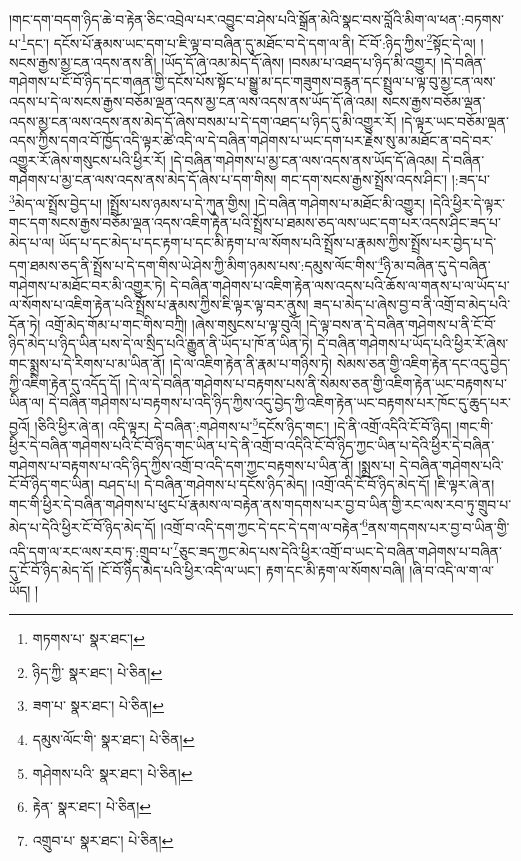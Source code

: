 །གང་དག་བདག་ཉིད་ཆེ་བ་རྟེན་ཅིང་འབྲེལ་པར་འབྱུང་བ་ཤེས་པའི་སྒྲོན་མེའི་སྣང་བས་བློའི་མིག་ལ་ཕན་:བཏགས་པ་\footnote{གཏགས་པ་  སྣར་ཐང་། }དང་། དངོས་པོ་རྣམས་ཡང་དག་པ་ཇི་ལྟ་བ་བཞིན་དུ་མཐོང་བ་དེ་དག་ལ་ནི། ངོ་བོ་:ཉིད་ཀྱིས་\footnote{ཉིད་ཀྱི་  སྣར་ཐང་།  པེ་ཅིན། }སྟོང་དེ་ལ། །སངས་རྒྱས་མྱ་ངན་འདས་ནས་ནི། །ཡོད་དོ་ཞེ་འམ་མེད་དོ་ཞེས། །བསམ་པ་འཐད་པ་ཉིད་མི་འགྱུར། །དེ་བཞིན་གཤེགས་པ་ངོ་བོ་ཉིད་དང་གཞན་གྱི་དངོས་པོས་སྟོང་པ་སྒྱུ་མ་དང་གཟུགས་བརྙན་དང་སྤྲུལ་པ་ལྟ་བུ་མྱ་ངན་ལས་འདས་པ་དེ་ལ་སངས་རྒྱས་བཅོམ་ལྡན་འདས་མྱ་ངན་ལས་འདས་ནས་ཡོད་དོ་ཞེ་འམ། སངས་རྒྱས་བཅོམ་ལྡན་འདས་མྱ་ངན་ལས་འདས་ནས་མེད་དོ་ཞེས་བསམ་པ་དེ་དག་འཐད་པ་ཉིད་དུ་མི་འགྱུར་རོ། །དེ་ལྟར་ཡང་བཅོམ་ལྡན་འདས་ཀྱིས་དགའ་བོ་ཁྱོད་འདི་ལྟར་ཚེ་འདི་ལ་དེ་བཞིན་གཤེགས་པ་ཡང་དག་པར་རྗེས་སུ་མ་མཐོང་ན་བདེ་བར་འགྱུར་རོ་ཞེས་གསུངས་པའི་ཕྱིར་རོ། །དེ་བཞིན་གཤེགས་པ་མྱ་ངན་ལས་འདས་ནས་ཡོད་དོ་ཞེའམ། དེ་བཞིན་གཤེགས་པ་མྱ་ངན་ལས་འདས་ནས་མེད་དོ་ཞེས་པ་དག་གིས། གང་དག་སངས་རྒྱས་སྤྲོས་འདས་ཤིང་། །:ཟད་པ་\footnote{ཟག་པ་  སྣར་ཐང་།  པེ་ཅིན། }མེད་ལ་སྤྲོས་བྱེད་པ། །སྤྲོས་པས་ཉམས་པ་དེ་ཀུན་གྱིས། །དེ་བཞིན་གཤེགས་པ་མཐོང་མི་འགྱུར། །དེའི་ཕྱིར་དེ་ལྟར་གང་དག་སངས་རྒྱས་བཅོམ་ལྡན་འདས་འཇིག་རྟེན་པའི་སྤྲོས་པ་ཐམས་ཅད་ལས་ཡང་དག་པར་འདས་ཤིང་ཟད་པ་མེད་པ་ལ། ཡོད་པ་དང་མེད་པ་དང་རྟག་པ་དང་མི་རྟག་པ་ལ་སོགས་པའི་སྤྲོས་པ་རྣམས་ཀྱིས་སྤྲོས་པར་བྱེད་པ་དེ་དག་ཐམས་ཅད་ནི་སྤྲོས་པ་དེ་དག་གིས་ཡེ་ཤེས་ཀྱི་མིག་ཉམས་པས་:དམུས་ལོང་གིས་\footnote{དམུས་ལོང་གི་  སྣར་ཐང་།  པེ་ཅིན། }ཉི་མ་བཞིན་དུ་དེ་བཞིན་གཤེགས་པ་མཐོང་བར་མི་འགྱུར་ཏེ། དེ་བཞིན་གཤེགས་པ་འཇིག་རྟེན་ལས་འདས་པའི་ཆོས་ལ་གནས་པ་ལ་ཡོད་པ་ལ་སོགས་པ་འཇིག་རྟེན་པའི་སྤྲོས་པ་རྣམས་ཀྱིས་ཇི་ལྟར་ལྟ་བར་ནུས། ཟད་པ་མེད་པ་ཞེས་བྱ་བ་ནི་འགྲོ་བ་མེད་པའི་དོན་ཏེ། འགྲོ་མེད་གོམ་པ་གང་གིས་བཀྲི། །ཞེས་གསུངས་པ་ལྟ་བུའོ། །དེ་ལྟ་བས་ན་དེ་བཞིན་གཤེགས་པ་ནི་ངོ་བོ་ཉིད་མེད་པ་ཉིད་ཡིན་པས་དེ་ལ་སྲིད་པའི་རྒྱུན་ནི་ཡོད་པ་ཁོ་ན་ཡིན་ཏེ། དེ་བཞིན་གཤེགས་པ་ཡོད་པའི་ཕྱིར་རོ་ཞེས་གང་སྨྲས་པ་དེ་རིགས་པ་མ་ཡིན་ནོ། །དེ་ལ་འཇིག་རྟེན་ནི་རྣམ་པ་གཉིས་ཏེ། སེམས་ཅན་གྱི་འཇིག་རྟེན་དང་འདུ་བྱེད་ཀྱི་འཇིག་རྟེན་དུ་འདོད་དོ། །དེ་ལ་དེ་བཞིན་གཤེགས་པ་བརྟགས་པས་ནི་སེམས་ཅན་གྱི་འཇིག་རྟེན་ཡང་བརྟགས་པ་ཡིན་ལ། དེ་བཞིན་གཤེགས་པ་བརྟགས་པ་འདི་ཉིད་ཀྱིས་འདུ་བྱེད་ཀྱི་འཇིག་རྟེན་ཡང་བརྟགས་པར་ཁོང་དུ་ཆུད་པར་བྱའོ། །ཅིའི་ཕྱིར་ཞེ་ན། འདི་ལྟར། དེ་བཞིན་:གཤེགས་པ་\footnote{གཤེགས་པའི་  སྣར་ཐང་།  པེ་ཅིན། }དངོས་ཉིད་གང་། །དེ་ནི་འགྲོ་འདིའི་ངོ་བོ་ཉིད། །གང་གི་ཕྱིར་དེ་བཞིན་གཤེགས་པའི་ངོ་བོ་ཉིད་གང་ཡིན་པ་དེ་ནི་འགྲོ་བ་འདིའི་ངོ་བོ་ཉིད་ཀྱང་ཡིན་པ་དེའི་ཕྱིར་དེ་བཞིན་གཤེགས་པ་བརྟགས་པ་འདི་ཉིད་ཀྱིས་འགྲོ་བ་འདི་དག་ཀྱང་བརྟགས་པ་ཡིན་ནོ། །སྨྲས་པ། དེ་བཞིན་གཤེགས་པའི་ངོ་བོ་ཉིད་གང་ཡིན། བཤད་པ། དེ་བཞིན་གཤེགས་པ་དངོས་ཉིད་མེད། །འགྲོ་འདི་ངོ་བོ་ཉིད་མེད་དོ། །ཇི་ལྟར་ཞེ་ན། གང་གི་ཕྱིར་དེ་བཞིན་གཤེགས་པ་ཕུང་པོ་རྣམས་ལ་བརྟེན་ནས་གདགས་པར་བྱ་བ་ཡིན་གྱི་རང་ལས་རབ་ཏུ་གྲུབ་པ་མེད་པ་དེའི་ཕྱིར་ངོ་བོ་ཉིད་མེད་དོ། །འགྲོ་བ་འདི་དག་ཀྱང་དེ་དང་དེ་དག་ལ་བརྟེན་\footnote{རྟེན་  སྣར་ཐང་།  པེ་ཅིན། }ནས་གདགས་པར་བྱ་བ་ཡིན་གྱི་འདི་དག་ལ་རང་ལས་རབ་ཏུ་:གྲུབ་པ་\footnote{འགྲུབ་པ་  སྣར་ཐང་།  པེ་ཅིན། }ཅུང་ཟད་ཀྱང་མེད་པས་དེའི་ཕྱིར་འགྲོ་བ་ཡང་དེ་བཞིན་གཤེགས་པ་བཞིན་དུ་ངོ་བོ་ཉིད་མེད་དོ། །ངོ་བོ་ཉིད་མེད་པའི་ཕྱིར་འདི་ལ་ཡང་། རྟག་དང་མི་རྟག་ལ་སོགས་བཞི། །ཞི་བ་འདི་ལ་ག་ལ་ཡོད། །
